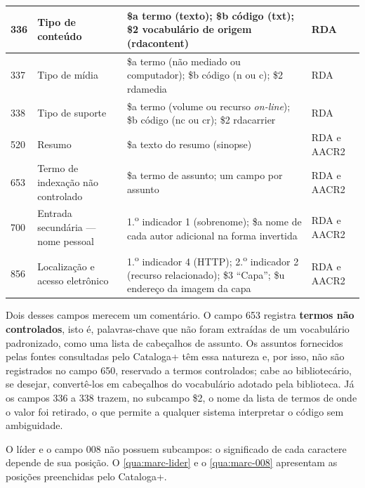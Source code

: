 \begin{quadro}[htbp]
\begin{tabular}{|p{}|p{}|p{}|p{}|}
    336 & Tipo de conteúdo & \$a termo (texto); \$b código (txt); \$2 vocabulário de origem (rdacontent) & RDA \\ \hline
    337 & Tipo de mídia & \$a termo (não mediado ou computador); \$b código (n ou c); \$2 rdamedia & RDA \\ \hline
    338 & Tipo de suporte & \$a termo (volume ou recurso \textit{on-line}); \$b código (nc ou cr); \$2 rdacarrier & RDA \\ \hline
    520 & Resumo & \$a texto do resumo (sinopse) & RDA e AACR2 \\ \hline
    653 & Termo de indexação não controlado & \$a termo de assunto; um campo por assunto & RDA e AACR2 \\ \hline
    700 & Entrada secundária --- nome pessoal & 1.\textsuperscript{o} indicador 1 (sobrenome); \$a nome de cada autor adicional na forma invertida & RDA e AACR2 \\ \hline
    856 & Localização e acesso eletrônico & 1.\textsuperscript{o} indicador 4 (HTTP); 2.\textsuperscript{o} indicador 2 (recurso relacionado); \$3 ``Capa''; \$u endereço da imagem da capa & RDA e AACR2 \\ \hline
    \end{tabular}
\end{quadro}

Dois desses campos merecem um comentário. O campo 653 registra \textbf{termos não controlados}, isto é, palavras-chave que não foram extraídas de um vocabulário padronizado, como uma lista de cabeçalhos de assunto. Os assuntos fornecidos pelas fontes consultadas pelo Cataloga+ têm essa natureza e, por isso, não são registrados no campo 650, reservado a termos controlados; cabe ao bibliotecário, se desejar, convertê-los em cabeçalhos do vocabulário adotado pela biblioteca. Já os campos 336 a 338 trazem, no subcampo \$2, o nome da lista de termos de onde o valor foi retirado, o que permite a qualquer sistema interpretar o código sem ambiguidade.

O líder e o campo 008 não possuem subcampos: o significado de cada caractere depende de sua posição. O \autoref{qua:marc-lider} e o \autoref{qua:marc-008} apresentam as posições preenchidas pelo Cataloga+.

